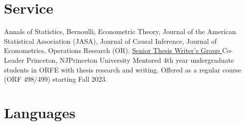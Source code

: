 \documentclass[10pt,a4paper,roman]{moderncv}        %
\begin{document}
\vspace{-0.3cm}
\section{Service}
{}
{}

{}
{
  Annals of Statistics,
  Bernoulli,
  Econometric Theory,
  Journal of the American Statistical Association (JASA),
  Journal of Causal Inference,
  Journal of Econometrics,
  Operations Research (OR).
}
{\color{blue}\href{https://orfe.princeton.edu/undergraduate/stwg}{Senior Thesis
    Writer's Group }\color{black} Co-Leader}
{Princeton, NJ}{Princeton University}
{Mentored 4th year undergraduate students in ORFE with thesis research and
  writing. Offered as a regular course (ORF 498/499) starting Fall 2023.
}
\vspace{-0.3cm}
\section{Languages}
\begin{cvcolumns}
\end{cvcolumns}



\clearpage
\end{document}

